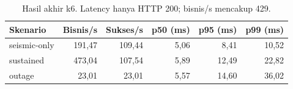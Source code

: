 \begin{table}[H]\centering\small
\begin{tabular}{lrrrrr}\toprule
Skenario & Bisnis/s & Sukses/s & p50 (ms) & p95 (ms) & p99 (ms)\\\midrule
seismic-only & 191,47 & 109,44 & 5,06 & 8,41 & 10,52\\
sustained & 473,04 & 107,54 & 5,89 & 12,49 & 22,82\\
outage & 23,01 & 23,01 & 5,57 & 14,60 & 36,02\\
\bottomrule\end{tabular}
\caption{Hasil akhir k6. Latency hanya HTTP 200; bisnis/s mencakup 429.}\end{table}
